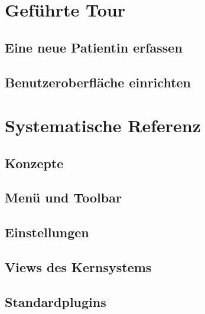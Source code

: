 \documentclass[a4paper,BCOR8.25mm,twoside]{scrbook}
\begin{document}



\part{Geführte Tour}
\chapter{Eine neue Patientin erfassen}
\label{tour}
	
\chapter{Benutzeroberfläche einrichten}
	\label{customize}
	

\part{Systematische Referenz}
\chapter{Konzepte}
	
\chapter{Menü und Toolbar} 					
	
\chapter{Einstellungen}
	
\chapter{Views des Kernsystems}
	
	
	
	
	
	
\chapter{Standardplugins}
	
	
	
	
	
	
	
	
	
	
	
	
	
	
	
\end{document}
